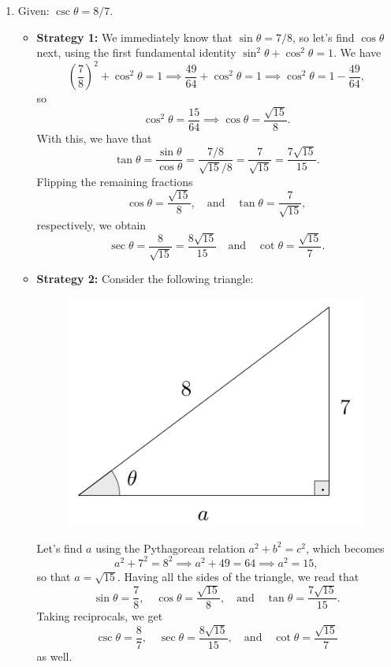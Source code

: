 \documentclass{ximera}
\begin{document}
\begin{example}
\begin{enumerate}[label=\alph*.]
  \item Given: $\csc\theta = 8/7$.

    \begin{explanation}
      \begin{itemize}
      \item {\bf Strategy 1:} We immediately know that $\sin\theta = 7/8$, so let's find $\cos\theta$ next, using the first fundamental identity $\sin^2\theta+\cos^2\theta=1$. We have $$\left(\frac{7}{8}\right)^2+\cos^2\theta=1 \implies \frac{49}{64}+\cos^2\theta=1 \implies \cos^2\theta = 1-\frac{49}{64},$$so $$\cos^2\theta = \frac{15}{64} \implies \cos\theta = \frac{\sqrt{15}}{8}.$$ With this, we have that \[   \tan\theta = \frac{\sin\theta}{\cos\theta} = \frac{7/8}{\sqrt{15}/8} = \frac{7}{\sqrt{15}} = \frac{7\sqrt{15}}{15}.  \]Flipping the remaining fractions $$\cos\theta = \frac{\sqrt{15}}{8}, \quad\mbox{and}\quad \tan\theta = \frac{7}{\sqrt{15}},$$respectively, we obtain $$\sec\theta = \frac{8}{\sqrt{15}} =\frac{8\sqrt{15}}{15} \quad\mbox{and}\quad \cot\theta =\frac{\sqrt{15}}{7}.$$
      \item {\bf Strategy 2:} Consider the following triangle: \begin{figure}[h]
          \centering
          \includegraphics[scale=.3]{./figures/9-1-3-triangle-csc-8-7.png}
        \end{figure}Let's find $a$ using the Pythagorean relation $a^2+b^2=c^2$, which becomes $$a^2+7^2=8^2\implies a^2+49=64\implies a^2 = 15,$$so that $a=\sqrt{15}$. Having all the sides of the triangle, we read that $$\sin\theta=\frac{7}{8},\quad\cos\theta=\frac{\sqrt{15}}{8},\quad\mbox{and}\quad\tan\theta=\frac{7\sqrt{15}}{15}.$$Taking reciprocals, we get $$\csc\theta=\frac{8}{7},\quad\sec\theta=\frac{8\sqrt{15}}{15},\quad\mbox{and}\quad\cot\theta=\frac{\sqrt{15}}{7}$$ as well.
      \end{itemize}
    \end{explanation}
    

\end{enumerate}
\end{example}
\end{document}

